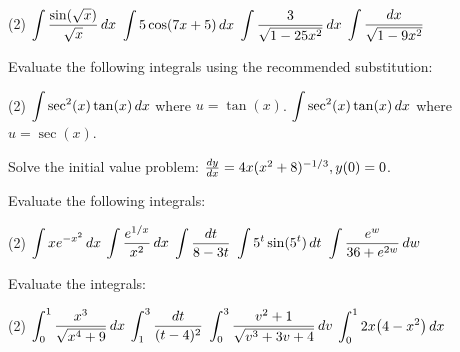 \documentclass[answers]{exam}
\begin{document}
  \begin{tasks}[after-item-skip=\stretch{1}, resume](2)
    \task $\ds\int \frac{\sin(\sqrt{x})}{\sqrt x}\,dx$
    \task $\ds\int 5\cos(7x+5)\,dx$
    \task $\ds\int \frac{3}{\sqrt{1-25x^2}}\,dx$
    \task $\ds\int \frac{dx}{\sqrt{1-9x^2}}$
  \end{tasks}
  \pagebreak
  \begin{ex*}
    Evaluate the following integrals using the recommended substitution:
  \end{ex*}
  \begin{tasks}(2)
    \task $\ds\int \sec^2(x)\tan(x)\,dx$ \newline where $u=\tan(x)$.
    \task $\ds\int \sec^2(x)\tan(x)\,dx$ \newline where $u=\sec(x)$.
  \end{tasks}
  \begin{ex*}
  Solve the initial value problem: $\frac{dy}{dx}=4x(x^2+8)\inv[1/3], y(0)=0$.
  \end{ex*}
  \pagebreak
  \begin{ex*}
    Evaluate the following integrals:
  \end{ex*}
  \begin{tasks}[after-item-skip=\stretch{1}](2)
    \task $\ds\int xe\inv[x^2]\,dx$
    \task $\ds\int \frac{e^{1/x}}{x^2}\,dx$
    \task $\ds\int \frac{dt}{8-3t}$
    \task $\ds\int 5^t\sin(5^t)\,dt$
    \task $\ds\int \frac{e^w}{36+e^{2w}}\,dw$
  \end{tasks}
  \pagebreak

  \noindent
  \begin{ex*}
    Evaluate the integrals:
  \end{ex*}
  \begin{tasks}[after-item-skip=\stretch{1}](2)
    \task $\ds\int_0^1 \frac{x^3}{\sqrt{x^4+9}}\,dx$
    \task $\ds\int_1^3 \frac{dt}{(t-4)^2}$
    \task $\ds\int_0^3 \frac{v^2+1}{\sqrt{v^3+3v+4}}\,dv$
    \task $\ds\int_0^1 2x\parens{4-x^2}\,dx$
  \end{tasks}
  \pagebreak
  
\end{document}
